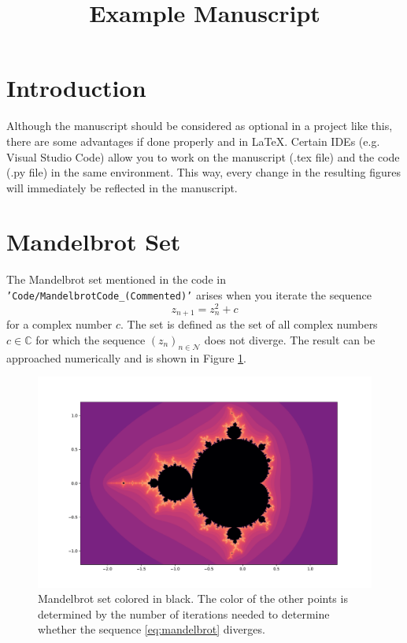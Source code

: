 \documentclass{article}
\title{Example Manuscript}
\newcommand{\code}[1]{{\texttt{#1}}}
\begin{document}
\section*{Introduction}

Although the manuscript should be considered as optional in a project like this, there are some advantages if done properly and in \LaTeX. Certain IDEs (e.g. Visual Studio Code) allow you to work on the manuscript (.tex file) and the code (.py file) in the same environment. This way, every change in the resulting figures will immediately be reflected in the manuscript. 

\section*{Mandelbrot Set}

The Mandelbrot set mentioned in the code in \code{'Code/MandelbrotCode\_(Commented)'} arises when you iterate the sequence 
\begin{equation}
    \label{eq:mandelbrot}
    z_{n+1} = z_n^2 + c
\end{equation}
for a complex number $c$. The set is defined as the set of all complex numbers $c \in \mathbb{C}$ for which the sequence $(z_n)_{n\in \mathcal{N}}$ does not diverge. The result can be approached numerically and is shown in Figure \ref{fig:mandelbrot}.

\begin{figure}
    \centering
    \includegraphics[width=\linewidth]{../Results/Figures/Mandelbrot.pdf}
    \caption{Mandelbrot set colored in black. The color of the other points is determined by the number of iterations needed to determine whether the sequence \eqref{eq:mandelbrot} diverges.}
    \label{fig:mandelbrot}
\end{figure}
\end{document}
